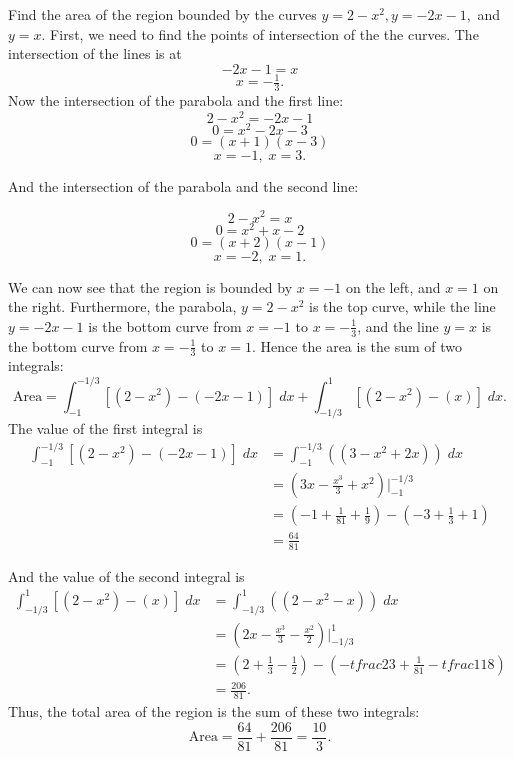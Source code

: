 \documentclass{ximera}
\begin{document}
\begin{example}
Find the area of the region bounded by the curves $y = 2-x^2, y = -2x-1,$ and $y = x$.
First, we need to find the points of intersection of the the curves. The intersection of the lines is at
\[
-2x-1 = x 
\]
\[
x = -\tfrac13.
\]
Now the intersection of the parabola and the first line:
\[
 2-x^2 = -2x-1
\]
\[
   0 = x^2 -2x -3 
\]
\[
   0 = (x+1)(x-3)
\]
\[
    x = -1, \; x = 3.
\]

And the intersection of the parabola and the second line:

\[
 2-x^2 = x
\]
\[
   0 =x^2 +x -2
\]
\[
   0 =(x+2)(x-1)
\]
\[
   x = -2, \; x = 1.
\]

We can now see that the region is bounded by $x = -1$ on the left, and  $x = 1$ on the right.
Furthermore, the parabola, $y = 2 - x^2$ is the top curve, while the line $y = -2x-1$ is the bottom curve 
from $x = -1$ to $x = -\frac13$, and the line $y = x$ is the bottom curve from $x = -\frac13$ to $x = 1$.
Hence the area is the sum of two integrals:
\[
\text{Area} = \int_{-1}^{-1/3} \left[(2 - x^2) - (-2x-1)\right] \; dx + \int_{-1/3}^1 \left[(2 - x^2) - (x)\right] \; dx.
\]
The value of the first integral is
\begin{align*}
\int_{-1}^{-1/3} \left[(2 - x^2) - (-2x-1)\right] \; dx &= \int_{-1}^{-1/3} \left((3 - x^2 +2x)\right) \; dx \\
                                                        &= \left(3x - \frac{x^3}{3} + x^2 \right)\bigg|_{-1}^{-1/3} \\
                                                        &= \left(-1 + \tfrac{1}{81} + \tfrac19 \right) - \left(-3 + \tfrac13 + 1 \right) \\
                                                        &= \tfrac{64}{81}
\end{align*}

And the value of the second integral is
\begin{align*}
\int_{-1/3}^{1} \left[(2 - x^2) - (x)\right] \; dx &= \int_{-1/3}^{1} \left((2 - x^2 - x)\right) \; dx \\
                                                        &= \left(2x - \frac{x^3}{3} -\frac{x^2}{2} \right)\bigg|_{-1/3}^{1} \\
                                                        &= \left(2 + \tfrac{1}{3} - \tfrac12 \right) - \left(-tfrac23 + \tfrac{1}{81} -tfrac{1}{18} \right) \\
                                                        &= \tfrac{206}{81}.
\end{align*}
Thus, the total area of the region is the sum of these two integrals:
\[
\text{Area} = \frac{64}{81} + \frac{206}{81} = \frac{10}{3}.
\]


\end{example}
\end{document}
